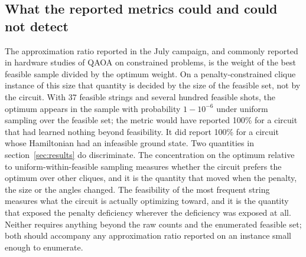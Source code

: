 \documentclass{iopjournal}
\begin{document}
\subsection{What the reported metrics could and could not detect}
\label{sec:disc_metrics}
The approximation ratio reported in the July campaign, and commonly reported in hardware studies of QAOA on constrained problems, is the weight of the best feasible sample divided by the optimum weight. On a penalty-constrained clique instance of this size that quantity is decided by the size of the feasible set, not by the circuit. With 37 feasible strings and several hundred feasible shots, the optimum appears in the sample with probability $1 - 10^{-6}$ under uniform sampling over the feasible set; the metric would have reported 100\% for a circuit that had learned nothing beyond feasibility. It did report 100\% for a circuit whose Hamiltonian had an infeasible ground state. Two quantities in section~\ref{sec:results} do discriminate. The concentration on the optimum relative to uniform-within-feasible sampling measures whether the circuit prefers the optimum over other cliques, and it is the quantity that moved when the penalty, the size or the angles changed. The feasibility of the most frequent string measures what the circuit is actually optimizing toward, and it is the quantity that exposed the penalty deficiency wherever the deficiency was exposed at all. Neither requires anything beyond the raw counts and the enumerated feasible set; both should accompany any approximation ratio reported on an instance small enough to enumerate.
\end{document}
